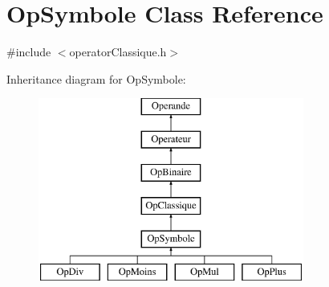 \hypertarget{class_op_symbole}{}\section{Op\+Symbole Class Reference}
\label{class_op_symbole}


{\ttfamily \#include $<$operator\+Classique.\+h$>$}

Inheritance diagram for Op\+Symbole\+:\begin{figure}[H]
\begin{center}
\leavevmode
\includegraphics[height=6.000000cm]{class_op_symbole}
\end{center}
\end{figure}
